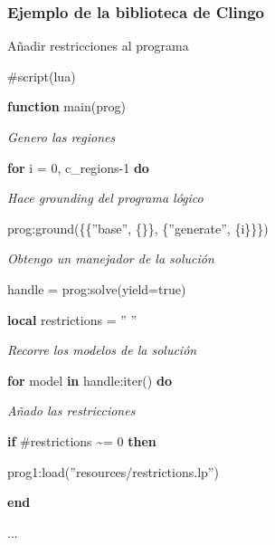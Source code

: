 \documentclass[10pt]{beamer}
\begin{document}
	\begin{frame}
	\frametitle{Ejemplo de la biblioteca de Clingo}
	
	\begin{block}{Añadir restricciones al programa}
		\ttfamily \footnotesize
		
		\#script(lua)
		
		\textbf{function} main(prog)
		
		\hspace{2em} \textit{\textendash\textendash Genero las regiones}
		
		\hspace{2em} \textbf{for} i = 0, c\_regions-1 \textbf{do}
		
		\hspace{4em} \textit{\textendash\textendash Hace grounding del programa lógico}
		
		\hspace{4em} prog:ground(\{\{''base'', \{\}\}, \{''generate'', \{i\}\}\})
		
		\hspace{4em} \textit{\textendash\textendash Obtengo un manejador de la solución}
		
		\hspace{4em} handle = prog:solve({yield=true})
		
		\vspace{1em}
		
		\hspace{4em} \textbf{local} restrictions = '' ''
		
		\hspace{4em} \textit{\textendash\textendash Recorre los modelos de la solución}
		
		\hspace{4em} \textbf{for} model \textbf{in} handle:iter() \textbf{do}
		
		\hspace{6em} \textit{\textendash\textendash Añado las restricciones}
		
		\hspace{6em} \textbf{if} \#restrictions \textasciitilde{}= 0 \textbf{then}
		
		\hspace{8em} prog1:load(''resources/restrictions.lp'')
		
		\hspace{6em} \textbf{end}
		
		\hspace{6em} ...
		
	\end{block}
	\end{frame}
	
\end{document}
